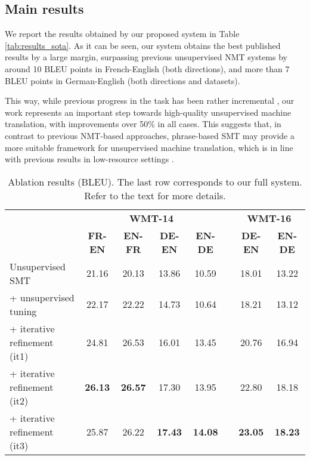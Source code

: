 \documentclass[11pt,a4paper]{article}
\begin{document}
\subsection{Main results} \label{subsec:results_main}

We report the results obtained by our proposed system in Table \ref{tab:results_sota}. As it can be seen, our system obtains the best published results by a large margin, surpassing previous unsupervised NMT systems by around 10 BLEU points in French-English (both directions), and more than 7 BLEU points in German-English (both directions and datasets).

This way, while previous progress in the task has been rather incremental \citep{yang2018unsupervised}, our work represents an important step towards high-quality unsupervised machine translation, with improvements over 50\% in all cases. This suggests that, in contrast to previous NMT-based approaches, phrase-based SMT may provide a more suitable framework for unsupervised machine translation, which is in line with previous results in low-resource settings \citep{koehn2017six}.

\begin{table*}[t]
\begin{center}
  \begin{tabular}{lccccccc}
    \toprule
    & \multicolumn{4}{c}{\bf WMT-14} & & \multicolumn{2}{c}{\bf WMT-16} \\
    \cmidrule{2-5} \cmidrule{7-8}
    & \multicolumn{1}{c}{\bf FR-EN} & \multicolumn{1}{c}{\bf EN-FR} & \multicolumn{1}{c}{\bf DE-EN} & \multicolumn{1}{c}{\bf EN-DE} & & \multicolumn{1}{c}{\bf DE-EN} & \multicolumn{1}{c}{\bf EN-DE} \\
    \midrule
    Unsupervised SMT & 21.16 & 20.13 & 13.86 & 10.59 & & 18.01 & 13.22 \\
    + unsupervised tuning & 22.17 & 22.22 & 14.73 & 10.64 & & 18.21 & 13.12 \\
    + iterative refinement (it1) & 24.81 & 26.53 & 16.01 & 13.45 & & 20.76 & 16.94 \\
    + iterative refinement (it2) & \bf 26.13 & \bf 26.57 & 17.30 & 13.95 & & 22.80 & 18.18 \\
    + iterative refinement (it3) & 25.87 & 26.22 & \bf 17.43 & \bf 14.08 & & \bf 23.05 & \bf 18.23 \\
    \bottomrule
  \end{tabular}
\end{center}
\caption{Ablation results (BLEU). The last row corresponds to our full system. Refer to the text for more details.}
\label{tab:results_ablation}
\end{table*}
\end{document}
